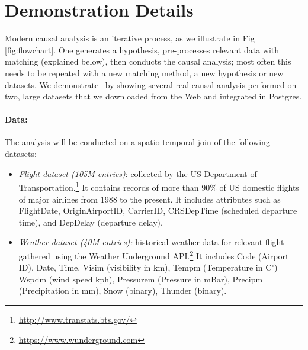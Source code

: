 \section{Demonstration Details}
\label{sec:dd}
Modern causal analysis is an iterative process, as we illustrate in Fig \ref{fig:flowchart}.
One generates a hypothesis, pre-processes  relevant data with matching (explained below),
  then conducts the causal analysis; most often this needs to be repeated with a new matching
  method, a new hypothesis or  new datasets.
We demonstrate \GSQL\ by showing several real causal analysis performed on two,
  large datasets that we downloaded from the Web and integrated in Postgres.


    \paragraph{\bf Data:} The analysis will be conducted on a spatio-temporal join of the following datasets:
 \begin{itemize}
   \item {\it Flight dataset (105M entries)}: collected by the US
Department of Transportation.\footnote{\url{http://www.transtats.bts.gov/}} It contains
records of more than 90\% of US domestic flights of major airlines
from 1988 to the present. It includes attributes such as FlightDate, OriginAirportID, CarrierID, CRSDepTime (scheduled departure time), and DepDelay (departure delay).
   \item {\it Weather dataset (40M entries):} historical weather data for relevant flight gathered using the Weather Underground API.\footnote{\url{https://www.wunderground.com}} It includes Code (Airport ID),
Date, Time,  Visim (visibility in km),
  Tempm (Temperature in C$^{\circ}$)
  Wspdm (wind speed kph), Pressurem (Pressure in mBar), Precipm  (Precipitation in mm), Snow (binary), Thunder (binary).
 \end{itemize}





